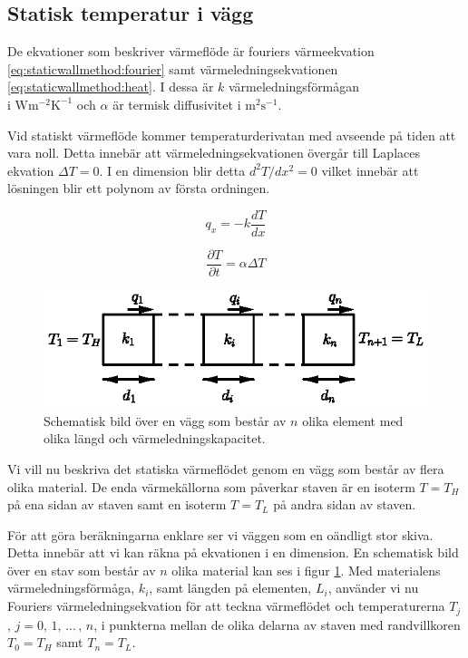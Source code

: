 \subsection{Statisk temperatur i vägg}


De ekvationer som beskriver värmeflöde är fouriers värmeekvation
\eqref{eq:staticwallmethod:fourier} samt värmeledningsekvationen
\eqref{eq:staticwallmethod:heat}. I dessa är
$k$ värmeledningsförmågan\\i $\mbox{W}\mbox{m}^{-2}\mbox{K}^{-1}$ och
$\alpha$ är termisk diffusivitet i $\mbox{m}^2\mbox{s}^{-1}$. \cite{physicshandbook}

Vid statiskt värmeflöde
kommer temperaturderivatan med avseende på tiden att vara noll.
Detta innebär att värmeledningsekvationen övergår till Laplaces ekvation
$\Delta{}T = 0$. I en dimension blir detta $d^2T/dx^2 = 0$ vilket innebär
att lösningen blir ett polynom av första ordningen.  

\begin{equation}
\label{eq:staticwallmethod:fourier}
q_x = -k\frac{dT}{dx}
\end{equation}

\begin{equation}
\label{eq:staticwallmethod:heat}
\frac{\partial{}T}{\partial{}t} = \alpha\Delta{}T
\end{equation}

\begin{figure}
\centering
\includegraphics{images/wall.eps}
\caption{Schematisk bild över en vägg som består av $n$ olika element med olika
längd och värmeledningskapacitet.}\label{fig:staticwallmethod:wall}
\end{figure}

\noindent
Vi vill nu beskriva det statiska värmeflödet genom en vägg som består
av flera olika material. De enda värmekällorna som påverkar staven
är en isoterm $T = T_H$ på ena sidan av staven
samt en isoterm $T = T_L$ på andra sidan av staven.

För att göra beräkningarna enklare
ser vi väggen som en oändligt stor skiva. Detta innebär att vi kan räkna
på ekvationen i en dimension. En schematisk bild över en stav som består av
$n$ olika material kan ses i figur \ref{fig:staticwallmethod:wall}.
Med materialens värmeledningsförmåga, $k_i$, samt längden
på elementen, $L_i$, använder vi nu Fouriers värmeledningsekvation för
att teckna värmeflödet och temperaturerna $T_j$,  $j=0,\,1,\,...\,,\,n$, i punkterna
mellan de olika delarna av staven med randvillkoren $T_0 = T_H$ samt
$T_n = T_L$.

